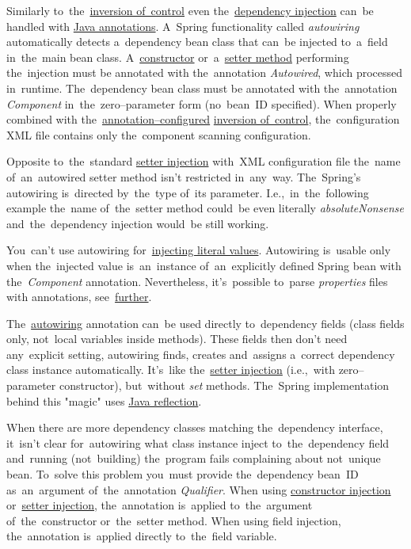 \label{autowiring}
Similarly to~the~\hyperref[springinversionofcontrol]{inversion of~control} even the~\hyperref[springdependencyinjection]{dependency injection} can~be handled with \hyperref[javaannotation]{Java annotations}.
A~Spring functionality called \textit{autowiring} automatically detects a~dependency bean class that can~be injected to~a~field in~the~main bean class.
A~\hyperref[constructorinjection]{constructor} or~a~\hyperref[setterinjection]{setter method} performing the~injection must be annotated with the~annotation \textit{Autowired}, which processed in~runtime.
The~dependency bean class must be annotated with the~annotation \textit{Component} in~the~zero--parameter form (no~bean~ID specified).
When properly combined with the~\hyperref[iocannotations]{annotation--configured} \hyperref[springinversionofcontrol]{inversion of~control}, the~configuration XML file contains only the~component scanning configuration.

\note Opposite to~the~standard \hyperref[setterinjection]{setter injection} with~XML configuration file the~name of~an~autowired setter method isn't restricted in~any~way.
The~Spring's autowiring is~directed by~the~type of~its parameter.
I.e.,~in~the~following example the~name of~the~setter method could~be even literally \textit{absoluteNonsense} and~the~dependency injection would~be still working.

\warning You~can't use autowiring for~\hyperref[injectingliteralvalues]{injecting literal values}.
Autowiring is~usable only when the~injected value is~an~instance of~an~explicitly defined Spring bean with the~\textit{Component} annotation.
Nevertheless, it's~possible to~parse \textit{properties} files with annotations, see~\hyperref[readingpropertiesannotations]{further}.

\label{fieldinjection}
The~\hyperref[autowiring]{autowiring} annotation can~be used directly to~dependency fields (class fields only, not~local variables inside methods).
These fields then don't need any~explicit setting, autowiring finds, creates and~assigns a~correct dependency class instance automatically.
It's~like the~\hyperref[setterinjection]{setter injection} (i.e.,~with zero--parameter constructor), but~without \textit{set} methods.
The~Spring implementation behind this "magic" uses \hyperref[reflection]{Java reflection}.

When there are more dependency classes matching the~dependency interface, it~isn't clear for~autowiring what class instance inject to~the~dependency field and~running (not~building) the~program fails complaining about not~unique bean.
To~solve this problem you~must provide the~dependency bean~ID as~an~argument of~the~annotation \textit{Qualifier}.
When using \hyperref[constructorinjectionautowire]{constructor injection} or~\hyperref[setterinjectionautowire]{setter injection}, the~annotation is~applied to~the~argument of~the~constructor or~the~setter method.
When using field injection, the~annotation is~applied directly to~the~field variable.
\newpage

